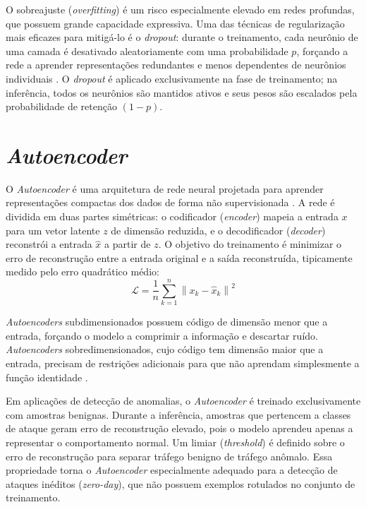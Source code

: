 O sobreajuste (\textit{overfitting}) é um risco especialmente elevado em redes profundas, que possuem grande capacidade expressiva. Uma das técnicas de regularização mais eficazes para mitigá-lo é o \textit{dropout}: durante o treinamento, cada neurônio de uma camada é desativado aleatoriamente com uma probabilidade $p$, forçando a rede a aprender representações redundantes e menos dependentes de neurônios individuais \cite{bochie2020sbrc}. O \textit{dropout} é aplicado exclusivamente na fase de treinamento; na inferência, todos os neurônios são mantidos ativos e seus pesos são escalados pela probabilidade de retenção $(1 - p)$.

\section{\textit{Autoencoder}}

O \textit{Autoencoder} é uma arquitetura de rede neural projetada para aprender representações compactas dos dados de forma não supervisionada \cite{bochie2020sbrc}. A rede é dividida em duas partes simétricas: o codificador (\textit{encoder}) mapeia a entrada $x$ para um vetor latente $z$ de dimensão reduzida, e o decodificador (\textit{decoder}) reconstrói a entrada $\hat{x}$ a partir de $z$. O objetivo do treinamento é minimizar o erro de reconstrução entre a entrada original e a saída reconstruída, tipicamente medido pelo erro quadrático médio:
\[
  \mathcal{L} = \frac{1}{n}\sum_{k=1}^{n}\left\|x_k - \hat{x}_k\right\|^2
\]

\textit{Autoencoders} subdimensionados possuem código de dimensão menor que a entrada, forçando o modelo a comprimir a informação e descartar ruído. \textit{Autoencoders} sobredimensionados, cujo código tem dimensão maior que a entrada, precisam de restrições adicionais para que não aprendam simplesmente a função identidade \cite{bochie2020sbrc}.

Em aplicações de detecção de anomalias, o \textit{Autoencoder} é treinado exclusivamente com amostras benignas. Durante a inferência, amostras que pertencem a classes de ataque geram erro de reconstrução elevado, pois o modelo aprendeu apenas a representar o comportamento normal. Um limiar (\textit{threshold}) é definido sobre o erro de reconstrução para separar tráfego benigno de tráfego anômalo. Essa propriedade torna o \textit{Autoencoder} especialmente adequado para a detecção de ataques inéditos (\textit{zero-day}), que não possuem exemplos rotulados no conjunto de treinamento.

